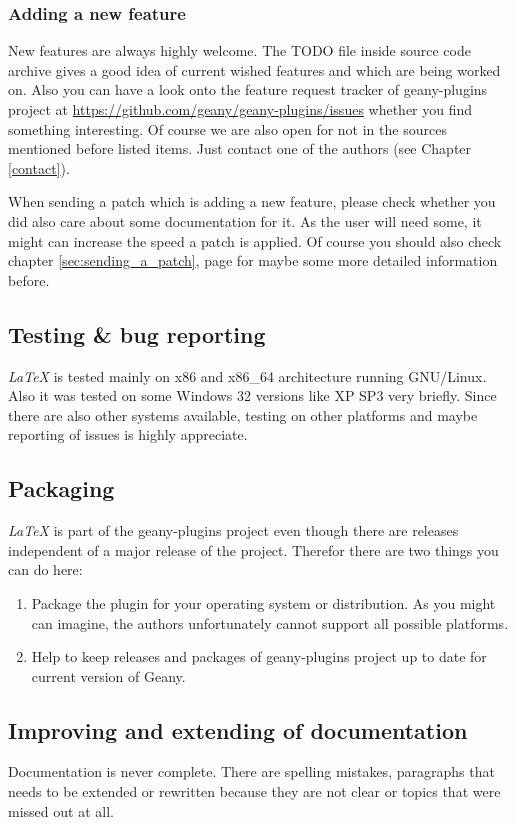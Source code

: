 \documentclass[%
paper=a4,%
fontsize=11pt,%
twoside=false,%
DIV18,%
headsepline,%
plainheadsepline,%
footsepline,%
plainfootsepline,%
bibliography=totoc,%
listof=totoc,%
BCOR10mm,%
parskip=half,%
openany,%
]{scrartcl}
\begin{document}
\subsubsection{Adding a new feature}
New features are always highly welcome. The TODO file inside source
code archive gives a good idea of current wished features and which
are being worked on. Also you can have a look onto the feature request
tracker of geany-plugins project at
\url{https://github.com/geany/geany-plugins/issues} whether you find
something interesting. Of course we are also open for not in the
sources mentioned before listed items. Just contact one of the authors
(see Chapter \ref{contact}).

When sending a patch which is adding a new feature, please check
whether you did also care about some documentation for it. As the
user will need some, it might can increase the speed a patch is
applied. Of course you should also check chapter \ref{sec:sending_a_patch},
page \pageref{sec:sending_a_patch} for maybe some more detailed
information before.

\subsection{Testing \& bug reporting} \textit{LaTeX} is tested mainly
on x86 and x86\_64 architecture running GNU/Linux. Also it was
tested on some Windows 32 versions like XP SP3 very briefly. Since
there are also other systems available, testing on other platforms
and maybe reporting of issues is highly appreciate.

\subsection{Packaging}
\textit{LaTeX} is part of the geany-plugins project even though there
are releases independent of a major release of the project. Therefor
there are two things you can do here:
\begin{enumerate}
	\item Package the plugin for your operating system or
	distribution. As you might can imagine, the authors unfortunately
	cannot support all possible platforms.
	\item Help to keep releases and packages of geany-plugins project
	up to date for current version of Geany.
\end{enumerate}


\subsection{Improving and extending of documentation}
Documentation is never complete. There are spelling mistakes,
paragraphs that needs to be extended or rewritten because they are not
clear or topics that were missed out at all.
\end{document}
